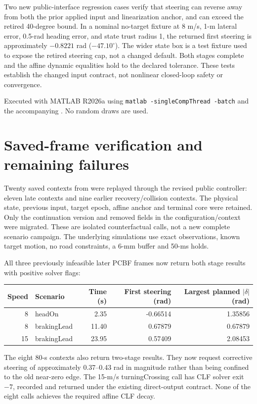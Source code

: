 \documentclass[11pt]{article}
\begin{document}
Two new public-interface regression cases verify that steering can reverse
away from both the prior applied input and linearization anchor, and can
exceed the retired 40-degree bound. In a nominal no-target fixture at 8 m/s,
1-m lateral error, 0.5-rad heading error, and state trust radius 1, the returned
first steering is approximately $-0.8221$ rad ($-47.10^\circ$). The wider state
box is a test fixture used to expose the retired steering cap, not a changed
default. Both stages complete and the affine dynamic equalities hold to the
declared tolerance. These tests establish the changed input contract, not
nonlinear closed-loop safety or convergence.

Executed with MATLAB R2026a using \texttt{matlab -singleCompThread -batch}
and the accompanying . No random draws are used.

\section{Saved-frame verification and remaining failures}
Twenty saved contexts from
were replayed through the revised public controller: eleven late contexts
and nine earlier recovery/collision contexts. The physical state, previous
input, target epoch, affine anchor and terminal core were retained. Only the
continuation version and removed fields in the configuration/context were
migrated. These are isolated counterfactual calls, not a new complete scenario
campaign. The underlying simulations use exact observations, known target
motion, no road constraints, a 6-mm buffer and 50-ms holds.

All three previously infeasible later PCBF frames now return both stage
results with positive solver flags:
\begin{center}\small
\begin{tabular}{r l r r r}
\toprule
Speed & Scenario & Time (s) & First steering (rad) & Largest planned $|\delta|$ (rad)\\
\midrule
8 & headOn & 2.35 & -0.66514 & 1.35856\\
8 & brakingLead & 11.40 & 0.67879 & 0.67879\\
15 & brakingLead & 23.95 & 0.57409 & 2.08453\\
\bottomrule
\end{tabular}\end{center}
The eight 80-s contexts also return two-stage results. They now request
corrective steering of approximately 0.37--0.43 rad in magnitude rather than
being confined to the old near-zero edge. The 15-m/s turningCrossing call has
CLF solver exit $-7$, recorded and returned under the existing direct-output
contract. None of the eight calls achieves the required affine CLF decay.
\end{document}
